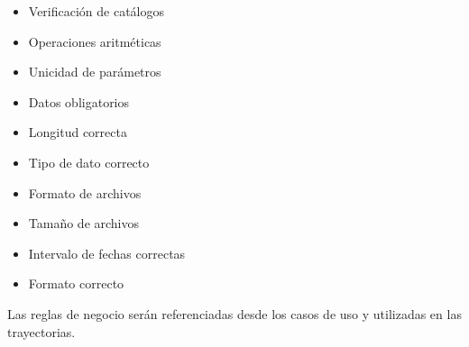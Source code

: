 \begin{enumerate}[{\bf RF1.}]
\begin{itemize}
		\item Verificación de catálogos
		\item Operaciones aritméticas
		\item Unicidad de parámetros
		\item Datos obligatorios
		\item Longitud correcta
		\item Tipo de dato correcto
		\item Formato de archivos
		\item Tamaño de archivos
		\item Intervalo de fechas correctas
		\item Formato correcto
	\end{itemize}
	Las reglas de negocio serán referenciadas desde los casos de uso y utilizadas en las trayectorias.
\end{enumerate}



